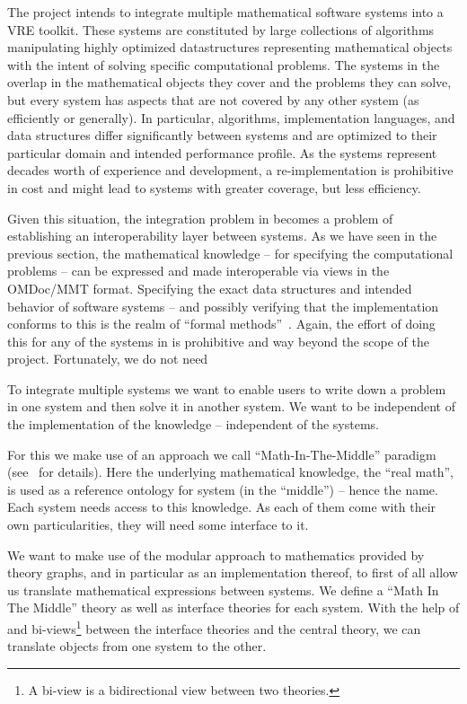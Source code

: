 The \pn project intends to integrate multiple mathematical software systems into a VRE
toolkit. These systems are constituted by large collections of algorithms manipulating
highly optimized datastructures representing mathematical objects with the intent of
solving specific computational problems. The systems in the overlap in the mathematical
objects they cover and the problems they can solve, but every system has aspects that are
not covered by any other system (as efficiently or generally). In particular, algorithms,
implementation languages, and data structures differ significantly between systems and are
optimized to their particular domain and intended performance profile. As the systems
represent decades worth of experience and development, a re-implementation is prohibitive
in cost and might lead to systems with greater coverage, but less efficiency. 

Given this situation, the integration problem in \pn becomes a problem of establishing an
interoperability layer between systems. As we have seen in the previous section, the
mathematical knowledge -- for specifying the computational problems -- can be expressed
and made interoperable via views in the OMDoc/MMT format. Specifying the exact data
structures and intended behavior of software systems -- and possibly verifying that the
implementation conforms to this is the realm of ``formal methods''~\cite{}. Again, the
effort of doing this for any of the systems in \pn is prohibitive and way beyond the scope
of the project. Fortunately, we do not need 



 To integrate multiple systems we want to enable
users to write down a problem in one system and then solve it in another system. We want
to be independent of the implementation of the knowledge -- independent of the systems.

For this we make use of an approach we call ``Math-In-The-Middle'' paradigm
(see~\cite{DehKohKon:iop16} for details). Here the underlying mathematical knowledge, the
``real math'', is used as a reference ontology for system (in the ``middle'') -- hence the
name. Each system needs access to this knowledge. As each of them come with their own
particularities, they will need some interface to it.

We want to make use of the modular approach to mathematics provided by theory graphs, and
in particular \MMT as an implementation thereof, to first of all allow us translate
mathematical expressions between systems. We define a ``Math In The Middle'' theory as
well as interface theories for each system. With the help of \MMT and bi-views\footnote{A
  bi-view is a bidirectional view between two theories. } between the interface theories and
the central theory, we can translate objects from one system to the other.

